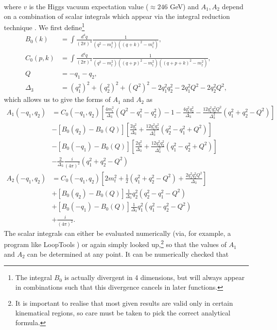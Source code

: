 where $v$ is the Higgs vacuum expectation value ($\approx 246$ GeV) and $A_1, A_2$ depend on a combination of scalar integrals which appear via the integral reduction technique \cite{Chetyrkin1981}. We first define\footnote{The integral $B_0$ is actually divergent in 4 dimensions, but will always appear in combinations such that this divergence cancels in later functions.}
\begin{equation}
\begin{split}
B_0(k) &= \int \frac{d^4 q}{(2 \pi)^4} \frac{1}{(q^2-m_t^2)((q+k)^2-m_t^2)}, \\
C_0(p,k) &= \int \frac{d^4 q}{(2 \pi)^4} \frac{1}{(q^2-m_t^2)((q+p)^2-m_t^2)((q+p+k)^2-m_t^2)}, \\
Q &= -q_1 - q_2, \\
\Delta_3 &= (q_1^2)^2 + (q_2^2)^2 + (Q^2)^2 - 2 q_1^2 q_2^2 - 2q_1^2Q^2 - 2q_2^2Q^2,
\end{split}
\label{eqn:scalars}
\end{equation}
which allows us to give the forms of $A_1$ and $A_2$ as
\begin{equation}
\begin{split}
A_1(-q_1,q_2) &= C_0(-q_1,q_2) \left[\frac{4 m_t^2}{\Delta_3}(Q^2-q_1^2-q_2^2)-1-\frac{4q_1^2q_2^2}{\Delta_3} - \frac{12q_1^2q_2^2Q^2}{\Delta_3^2}(q_1^2+q_2^2-Q^2) \right] \\
&- \left[B_0(q_2)-B_0(Q) \right] \left[\frac{2 q_1^2}{\Delta_3} + \frac{12 q_1^2 q_2^2}{\Delta_3^2}(q_2^2-q_1^2+Q^2) \right] \\
& - \left[B_0(-q_1)-B_0(Q) \right] \left[\frac{2q_1^2}{\Delta_3} + \frac{12 q_1^2 q_2^2}{\Delta_3^2}(q_1^2-q_2^2+Q^2) \right] \\
& - \frac{2}{\Delta_3} \frac{i}{(4 \pi)^2}(q_1^2 + q_2^2 - Q^2) \\
A_2(-q_1,q_2) &=  C_0(-q_1,q_2) \left[2 m_t^2 + \frac{1}{2}(q_1^2+q_2^2-Q^2) + \frac{2 q_1^2 q_2^2Q^2}{\Delta_3} \right] \\
&+ \left[B_0(q_2)-B_0(Q) \right] \frac{1}{\Delta_3}q_2^2(q_2^2-q_1^2-Q^2) \\
& + \left[B_0(-q_1)-B_0(Q) \right] \frac{1}{\Delta_3}q_1^2(q_1^2-q_2^2-Q^2)\\
& +\frac{i}{(4 \pi)^2}.
\label{eqn:afuncs} 
\end{split}
\end{equation}
The scalar integrals can either be evaluated numerically (via, for example, a program like LoopTools \cite{Hahn1999}) or again simply looked up,\footnote{It is important to realise that most given results are valid only in certain kinematical regions, so care must be taken to pick the correct analytical formula.} so that the values of $A_1$ and $A_2$ can be determined at any point. It can be numerically checked that
